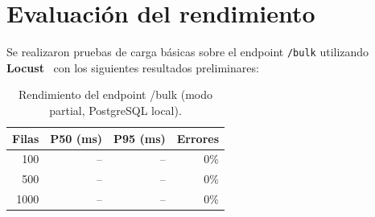 \section{Evaluación del rendimiento}
\label{sec:evaluacion-rendimiento}


Se realizaron pruebas de carga básicas sobre el endpoint \texttt{/bulk} utilizando
\textbf{Locust}~\cite{locust} con los siguientes resultados preliminares:

\begin{table}[H]
  \centering
  \caption{Rendimiento del endpoint /bulk (modo partial, PostgreSQL local).}
  \label{tab:rendimiento-bulk}
  \begin{tabular}{rrrr}
    \toprule
    \textbf{Filas} & \textbf{P50 (ms)} & \textbf{P95 (ms)} & \textbf{Errores} \\
    \midrule
    100  & -- & -- & 0\% \\
    500  & -- & -- & 0\% \\
    1000 & -- & -- & 0\% \\
    \bottomrule
  \end{tabular}
\end{table}
